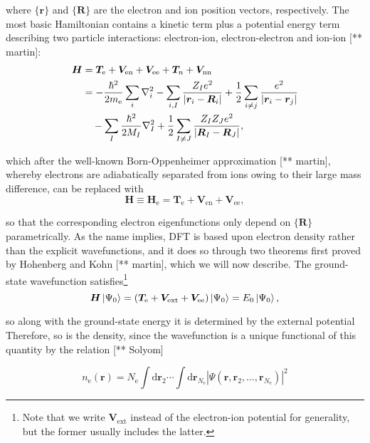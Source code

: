 where \(\{\bm r\}\) and \(\{\bm R\}\) are the electron and ion position vectors, respectively. The most basic Hamiltonian contains a kinetic term plus a potential energy term describing two particle interactions: electron-ion, electron-electron and ion-ion [** martin]:
\begin{equation}
\begin{split}
\bm{H} &= \bm T_{\mathrm e} + \bm V_{\mathrm{en}}+\bm V_{\mathrm{ee}}+\bm T_n+\bm V_{\mathrm{nn}}\\
&= -\frac{\hbar^2}{2m_{\mathrm{e}}}\sum_i\nabla_i^2-\sum_{i,I}\frac{Z_Ie^2}{\abs{\bm r_i-\bm R_i}} + \frac 1 2 \sum_{i\neq j}\frac{e^2}{\abs{\bm r_i-\bm r_j}}\\
&\quad-\sum_I\frac{\hbar^2}{2M_I}\nabla_I^2+\frac 1 2 \sum_{I\neq J}\frac{Z_IZ_Je^2}{\abs{\bm R_I-\bm R_J}},
\end{split}
\end{equation}

which after the well-known Born-Oppenheimer approximation [** martin], whereby electrons are adiabatically separated from ions owing to their large mass difference, can be replaced with
\begin{equation}
\bm{H}\equiv\bm H_{\mathrm e} = \bm T_{\mathrm e} + \bm V_{\mathrm{en}}+\bm V_{\mathrm{ee}},
\end{equation}


so that the corresponding electron eigenfunctions only depend on \(\{\bm R\}\) parametrically. As the name implies, DFT is based upon electron density rather than the explicit wavefunctions, and it does so through two theorems first proved by Hohenberg and Kohn [** martin], which we will now describe. The ground-state wavefunction satisfies\footnote{Note that we write \(\bm V_{\mathrm{ext}}\) instead of the electron-ion potential for generality, but the former usually includes the latter.}
\begin{equation}
\bm H \ket{\Psi_0}=(\bm T_{\mathrm e} + \bm V_{\mathrm{ext}}+\bm V_{\mathrm{ee}})\ket{\Psi_0}=E_0\ket{\Psi_0},
\end{equation}

so along with the ground-state energy it is determined by the external potential Therefore, so is the density, since the wavefunction is a unique functional of this quantity by the relation [** Solyom]

\begin{equation}
	n_{\mathrm{e}}(\bm{r})=N_{\mathrm{e}} \int \mathrm{d} \bm{r}_{2} \cdots \int \mathrm{d} \bm{r}_{N_{\mathrm{e}}}\left|\Psi\left(\bm{r}, \bm{r}_{2}, \ldots, \bm{r}_{N_{\mathrm{e}}}\right)\right|^{2}
\end{equation}

